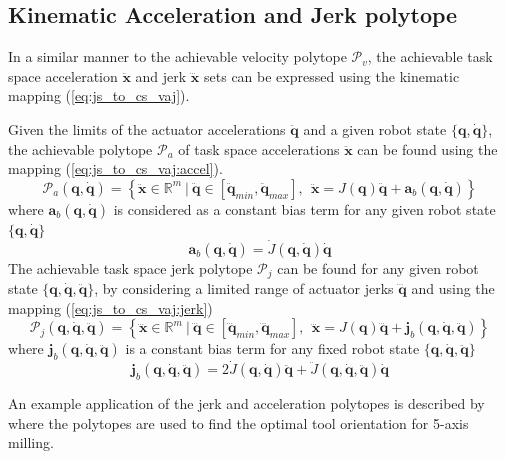 \subsection{Kinematic Acceleration and Jerk polytope}\label{ch:kin_accel_jerk}
In a similar manner to the achievable velocity polytope $\mathcal{P}_v$, the achievable task space acceleration $\ddot{\bm{x}}$ and jerk $\dddot{\bm{x}}$ sets can be expressed using the kinematic mapping (\ref{eq:js_to_cs_vaj}). 

Given the limits of the actuator accelerations $\ddot{\bm{q}}$ and a given robot state $\{\bm{q},\dot{\bm{q}}\}$, the achievable polytope $\mathcal{P}_a$ of task space accelerations $\ddot{\bm{x}}$ can be found using the mapping (\ref{eq:js_to_cs_vaj:accel}).
\begin{equation}
    \mathcal{P}_a(\bm{q}, \dot{\bm{q}}) = \left\{ \ddot{\bm{x}} \in \mathbb{R}^m ~|~ \ddot{\bm{q}}\in\left[\ddot{\bm{q}}_{min}, \ddot{\bm{q}}_{max} \right], ~~ \ddot{\bm{x}} = J(\bm{q})\ddot{\bm{q}} + \bm{a}_b(\bm{q}, \dot{\bm{q}})  \right\}
    \label{eq:poly_accel_kin}
\end{equation}
where $\bm{a}_b(\bm{q}, \dot{\bm{q}})$ is considered as a constant bias term for any given robot state $\{\bm{q},\dot{\bm{q}}\}$
\begin{equation}
    \bm{a}_b(\bm{q}, \dot{\bm{q}}) = \dot{J}(\bm{q},\dot{\bm{q}})\dot{\bm{q}}
\end{equation}
The achievable task space jerk polytope $\mathcal{P}_j$ can be found for any given robot state $\{\bm{q},\dot{\bm{q}},\ddot{\bm{q}}\}$, by considering a limited range of actuator jerks $\dddot{\bm{q}}$ and using the mapping (\ref{eq:js_to_cs_vaj:jerk})
\begin{equation}
    \mathcal{P}_j(\bm{q}, \dot{\bm{q}}, \ddot{\bm{q}}) = \left\{ \dddot{\bm{x}} \in \mathbb{R}^m ~|~ \dddot{\bm{q}}\in\left[\dddot{\bm{q}}_{min}, \dddot{\bm{q}}_{max} \right], ~~ \dddot{\bm{x}} = J(\bm{q})\dddot{\bm{q}} + \bm{j}_b(\bm{q}, \dot{\bm{q}},\ddot{\bm{q}}) \right\}
    \label{eq:poly_jerk_kin}
\end{equation}
where $\bm{j}_b(\bm{q}, \dot{\bm{q}},\ddot{\bm{q}})$ is a constant bias term for any fixed robot state $\{\bm{q},\dot{\bm{q}},\ddot{\bm{q}}\}$
\begin{equation}
    \bm{j}_b(\bm{q}, \dot{\bm{q}},\ddot{\bm{q}}) =2\dot{J}(\bm{q},\dot{\bm{q}})\ddot{\bm{q}}+ \ddot{J}(\bm{q},\dot{\bm{q}},\ddot{\bm{q}})\dot{\bm{q}}
\end{equation}

An example application of the jerk and acceleration polytopes is described by \citet{Grandguillaume2021} where the polytopes are used to find the optimal tool orientation for 5-axis milling.

